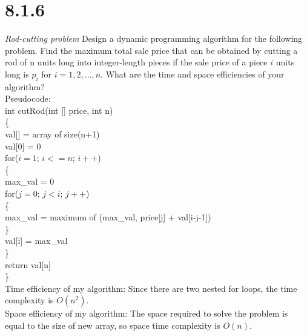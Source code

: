 \documentclass{article}
\begin{document}
\section{8.1.6}
\textit{Rod-cutting problem} Design a dynamic programming algorithm for the following problem. Find the maximum total sale price that can be obtained by cutting a rod of n units long into integer-length pieces if the sale price of a piece $i$ units long is $p_i$ for $i = 1, 2, . . . , n$. What are the time and space efficiencies of your algorithm? \\
Pseudocode: \\
int cutRod(int [] price, int n) \\
\{ \\
\indent val[] = array of size(n+1)\\
\indent val[0] = 0 \\
\indent for($i = 1$; $i <= n$; $i++$) \\
\indent \{ \\
\indent \indent max\_val = 0 \\ 
\indent \indent for($j=0$; $j < i$; $j++$) \\
\indent \indent \{ \\
\indent \indent \indent max\_val = maximum of (max\_val, price[j] + val[i-j-1]) \\
\indent \indent \} \\
\indent \indent val[i] = max\_val \\
\indent \} \\
\indent return val[n] \\
\} \\
Time efficiency of my algorithm: Since there are two nested for loops, the time complexity is $O(n^2)$. \\
Space efficiency of my algorithm: The space required to solve the problem is equal to the size of new array, so space time complexity is $O(n)$.
\end{document}
